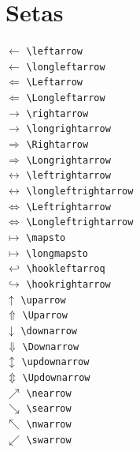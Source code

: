 \documentclass{fei}
\begin{document}
\section{Setas}
\begin{multicols}{2}
\noindent
\(\leftarrow\) \verb+\leftarrow+\\
\(\longleftarrow\) \verb+\longleftarrow+\\
\(\Leftarrow\) \verb+\Leftarrow+\\
\(\Longleftarrow\) \verb+\Longleftarrow+\\
\(\rightarrow\) \verb+\rightarrow+\\
\(\longrightarrow\) \verb+\longrightarrow+\\
\(\Rightarrow\) \verb+\Rightarrow+\\
\(\Longrightarrow\) \verb+\Longrightarrow+\\
\(\leftrightarrow\) \verb+\leftrightarrow+\\
\(\longleftrightarrow\) \verb+\longleftrightarrow+\\
\(\Leftrightarrow\) \verb+\Leftrightarrow+\\
\(\Longleftrightarrow\) \verb+\Longleftrightarrow+\\
\(\mapsto\) \verb+\mapsto+\\
\(\longmapsto\) \verb+\longmapsto+\\
\(\hookleftarrow\) \verb+\hookleftarroq+\\
\(\hookrightarrow\) \verb+\hookrightarrow+\\
\(\uparrow\) \verb+\uparrow+\\
\(\Uparrow\) \verb+\Uparrow+\\
\(\downarrow\) \verb+\downarrow+\\
\(\Downarrow\) \verb+\Downarrow+\\
\(\updownarrow\) \verb+\updownarrow+\\
\(\Updownarrow\) \verb+\Updownarrow+\\
\(\nearrow\) \verb+\nearrow+\\
\(\searrow\) \verb+\searrow+\\
\(\nwarrow\) \verb+\nwarrow+\\
\(\swarrow\) \verb+\swarrow+\\
\end{multicols}

\indice
	
\end{document}
